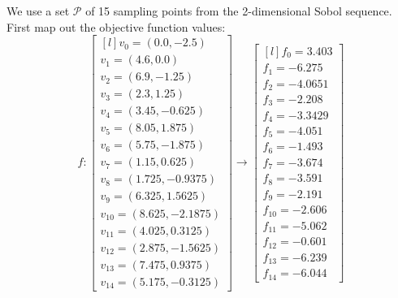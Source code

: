 We use a set $\mathcal{P}$ of 15 sampling points from the 2-dimensional Sobol sequence. First map out the objective function values:
\begin{equation} \label{eq:ursemmap}
f:
\begin{bmatrix} [l]
v_{0} = (0.0, -2.5) \\
v_{1} = (4.6, 0.0) \\
v_{2} = (6.9, -1.25) \\
v_{3} = (2.3, 1.25) \\
v_{4} = (3.45, -0.625) \\
v_{5} = (8.05, 1.875) \\
v_{6} = (5.75, -1.875) \\
v_{7} = (1.15, 0.625) \\
v_{8} = (1.725, -0.9375) \\
v_{9} = (6.325, 1.5625) \\
v_{10} = (8.625, -2.1875) \\
v_{11} = (4.025, 0.3125) \\
v_{12} = (2.875, -1.5625) \\
v_{13} = (7.475, 0.9375) \\
v_{14} = (5.175, -0.3125)  
\end{bmatrix}
\rightarrow
\begin{bmatrix} [l]
f_{0} = 3.403\\
f_{1} = -6.275\\
f_{2} = -4.0651\\
f_{3} = -2.208\\
f_{4} = -3.3429\\
f_{5} = -4.051\\
f_{6} = -1.493\\
f_{7} = -3.674\\
f_{8} = -3.591\\
f_{9} = -2.191\\
f_{10} = -2.606\\
f_{11} = -5.062\\
f_{12} = -0.601\\
f_{13} = -6.239\\
f_{14} = -6.044
\end{bmatrix}
\end{equation}

